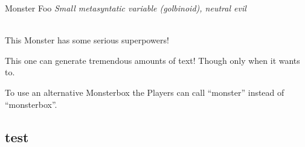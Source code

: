 \documentclass[10pt,twoside]{article}
\begin{document}
\begin{multicols}{2}
\begin{monsterbox}{Monster Foo}
	\textit{Small metasyntatic variable (golbinoid), neutral evil}\\
	\hline
	\basics[%
	armorclass = 12,
	hitpoints  = 16 (3d8 + 3),
	speed      = 50 ft
	]
	\hline
	\stats[
	STR = 12 (+1),
	DEX = 14 (+2)
	]
	\hline
	\details[%
	languages = {Common Lisp, Erlang},
	]
	\hline \\[1mm]
	\begin{monsteraction}
		This Monster has some serious superpowers!
	\end{monsteraction}
	\begin{monsteraction}
		This one can generate tremendous amounts of text! Though only when it wants to.
	\end{monsteraction}
	
	\begin{monsteraction}
		To use an alternative Monsterbox the Players can call "`monster"' instead of "`monsterbox"'.
	\end{monsteraction}
\end{monsterbox}
    \lipsum
    \subsection{test}
    \lipsum
    \lipsum
\end{multicols}
\end{document}
